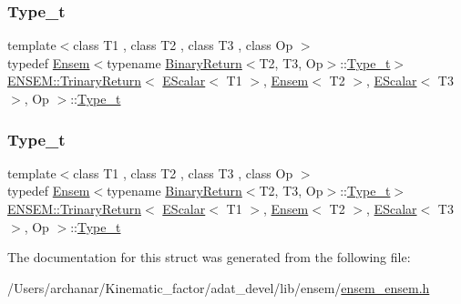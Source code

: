 \subsubsection{\texorpdfstring{Type\_t}{Type\_t}\hspace{0.1cm}{\footnotesize\ttfamily [1/2]}}
{\footnotesize\ttfamily template$<$class T1 , class T2 , class T3 , class Op $>$ \\
typedef \mbox{\hyperlink{classENSEM_1_1Ensem}{Ensem}}$<$typename \mbox{\hyperlink{structENSEM_1_1BinaryReturn}{Binary\+Return}}$<$T2, T3, Op$>$\+::\mbox{\hyperlink{structENSEM_1_1TrinaryReturn_3_01EScalar_3_01T1_01_4_00_01Ensem_3_01T2_01_4_00_01EScalar_3_01T3_01_4_00_01Op_01_4_a98ef67a0030ae73c26e820e20e622f06}{Type\+\_\+t}}$>$ \mbox{\hyperlink{structENSEM_1_1TrinaryReturn}{E\+N\+S\+E\+M\+::\+Trinary\+Return}}$<$ \mbox{\hyperlink{classENSEM_1_1EScalar}{E\+Scalar}}$<$ T1 $>$, \mbox{\hyperlink{classENSEM_1_1Ensem}{Ensem}}$<$ T2 $>$, \mbox{\hyperlink{classENSEM_1_1EScalar}{E\+Scalar}}$<$ T3 $>$, Op $>$\+::\mbox{\hyperlink{structENSEM_1_1TrinaryReturn_3_01EScalar_3_01T1_01_4_00_01Ensem_3_01T2_01_4_00_01EScalar_3_01T3_01_4_00_01Op_01_4_a98ef67a0030ae73c26e820e20e622f06}{Type\+\_\+t}}}

\mbox{\label{structENSEM_1_1TrinaryReturn_3_01EScalar_3_01T1_01_4_00_01Ensem_3_01T2_01_4_00_01EScalar_3_01T3_01_4_00_01Op_01_4_a98ef67a0030ae73c26e820e20e622f06}} 
\subsubsection{\texorpdfstring{Type\_t}{Type\_t}\hspace{0.1cm}{\footnotesize\ttfamily [2/2]}}
{\footnotesize\ttfamily template$<$class T1 , class T2 , class T3 , class Op $>$ \\
typedef \mbox{\hyperlink{classENSEM_1_1Ensem}{Ensem}}$<$typename \mbox{\hyperlink{structENSEM_1_1BinaryReturn}{Binary\+Return}}$<$T2, T3, Op$>$\+::\mbox{\hyperlink{structENSEM_1_1TrinaryReturn_3_01EScalar_3_01T1_01_4_00_01Ensem_3_01T2_01_4_00_01EScalar_3_01T3_01_4_00_01Op_01_4_a98ef67a0030ae73c26e820e20e622f06}{Type\+\_\+t}}$>$ \mbox{\hyperlink{structENSEM_1_1TrinaryReturn}{E\+N\+S\+E\+M\+::\+Trinary\+Return}}$<$ \mbox{\hyperlink{classENSEM_1_1EScalar}{E\+Scalar}}$<$ T1 $>$, \mbox{\hyperlink{classENSEM_1_1Ensem}{Ensem}}$<$ T2 $>$, \mbox{\hyperlink{classENSEM_1_1EScalar}{E\+Scalar}}$<$ T3 $>$, Op $>$\+::\mbox{\hyperlink{structENSEM_1_1TrinaryReturn_3_01EScalar_3_01T1_01_4_00_01Ensem_3_01T2_01_4_00_01EScalar_3_01T3_01_4_00_01Op_01_4_a98ef67a0030ae73c26e820e20e622f06}{Type\+\_\+t}}}



The documentation for this struct was generated from the following file\+:\begin{DoxyCompactItemize}
\item 
/\+Users/archanar/\+Kinematic\+\_\+factor/adat\+\_\+devel/lib/ensem/\mbox{\hyperlink{lib_2ensem_2ensem__ensem_8h}{ensem\+\_\+ensem.\+h}}\end{DoxyCompactItemize}
